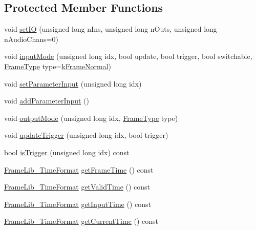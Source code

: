 \subsection*{Protected Member Functions}
\begin{DoxyCompactItemize}
\item 
void \hyperlink{class_frame_lib___d_s_p_a3d184baeb7b55fa099cb9c4a7393c70c}{set\+IO} (unsigned long n\+Ins, unsigned long n\+Outs, unsigned long n\+Audio\+Chans=0)
\item 
void \hyperlink{class_frame_lib___d_s_p_af9c0571cc8f82bb560be0f0cfcd73d78}{input\+Mode} (unsigned long idx, bool update, bool trigger, bool switchable, \hyperlink{_frame_lib___types_8h_ad495a9f61af7fff07d7e97979d1ab854}{Frame\+Type} type=\hyperlink{_frame_lib___types_8h_ad495a9f61af7fff07d7e97979d1ab854a4bc2388cbdd721f5039a32f95cd92b03}{k\+Frame\+Normal})
\item 
void \hyperlink{class_frame_lib___d_s_p_abcbe8babb74a7b85faf8846b4a0ff95f}{set\+Parameter\+Input} (unsigned long idx)
\item 
void \hyperlink{class_frame_lib___d_s_p_aa000b56c19ad1fbdc4f3fe56b0ca762d}{add\+Parameter\+Input} ()
\item 
void \hyperlink{class_frame_lib___d_s_p_a82ba080c4038eede7bae208555df1780}{output\+Mode} (unsigned long idx, \hyperlink{_frame_lib___types_8h_ad495a9f61af7fff07d7e97979d1ab854}{Frame\+Type} type)
\item 
void \hyperlink{class_frame_lib___d_s_p_a2e3084ad267a330ec021bd558edd3f57}{update\+Trigger} (unsigned long idx, bool trigger)
\item 
bool \hyperlink{class_frame_lib___d_s_p_a13e269a66e0b9fb40ead089530e49eaa}{is\+Trigger} (unsigned long idx) const
\item 
\hyperlink{_frame_lib___types_8h_a699a4071a9eaaa283906a5ebd0a79ac0}{Frame\+Lib\+\_\+\+Time\+Format} \hyperlink{class_frame_lib___d_s_p_a2eedff2474f665b5bf7d2f2fa7a1cdc4}{get\+Frame\+Time} () const
\item 
\hyperlink{_frame_lib___types_8h_a699a4071a9eaaa283906a5ebd0a79ac0}{Frame\+Lib\+\_\+\+Time\+Format} \hyperlink{class_frame_lib___d_s_p_afa420e10b7ea7a300bf106631167cac0}{get\+Valid\+Time} () const
\item 
\hyperlink{_frame_lib___types_8h_a699a4071a9eaaa283906a5ebd0a79ac0}{Frame\+Lib\+\_\+\+Time\+Format} \hyperlink{class_frame_lib___d_s_p_afd7cae225f75c8cd4bd773bf188961b2}{get\+Input\+Time} () const
\item 
\hyperlink{_frame_lib___types_8h_a699a4071a9eaaa283906a5ebd0a79ac0}{Frame\+Lib\+\_\+\+Time\+Format} \hyperlink{class_frame_lib___d_s_p_a5734f973e603be4a85764d5f77fa4004}{get\+Current\+Time} () const

\end{DoxyCompactItemize}
